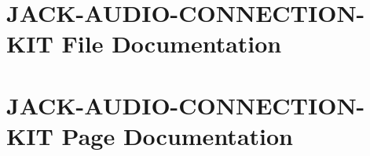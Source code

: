 \documentclass[letterpaper]{book}
\begin{document}
\chapter{JACK-AUDIO-CONNECTION-KIT File Documentation}













\chapter{JACK-AUDIO-CONNECTION-KIT Page Documentation}



\printindex
\end{document}
